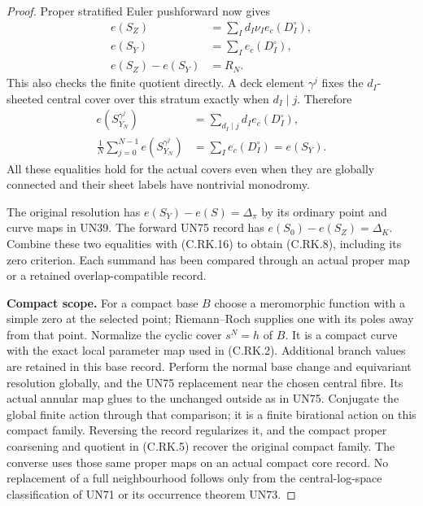 \begin{proof}
Proper stratified Euler
pushforward now gives
\[
 \begin{split}
 e(S_Z)&=\sum_I d_I\nu_I e_c(D_I^\circ),\\
 e(S_Y)&=\sum_I e_c(D_I^\circ),\\
 e(S_Z)-e(S_Y)&=R_N.
 \end{split}
\tag{C.RK.16}
\]
This also checks the finite
quotient directly. A deck
element $\gamma^j$ fixes the
$d_I$-sheeted central cover
over this stratum exactly
when $d_I\mid j$. Therefore
\[
 \begin{split}
 e(S_{Y_N}^{\gamma^j})
       &=\sum_{d_I\mid j}d_I e_c(D_I^\circ),\\
 \frac1N\sum_{j=0}^{N-1}
          e(S_{Y_N}^{\gamma^j})
       &=\sum_I e_c(D_I^\circ)=e(S_Y).
 \end{split}
\tag{C.RK.17}
\]
All these equalities hold for
the actual covers even when
they are globally connected
and their sheet labels have
nontrivial monodromy.

The original resolution has
$e(S_Y)-e(S)=\Delta_\pi$ by
its ordinary point and curve
maps in UN39. The forward
UN75 record has
$e(S_0)-e(S_Z)=\Delta_K$.
Combine these two equalities
with (C.RK.16) to obtain
(C.RK.8), including its zero
criterion. Each summand has
been compared through an
actual proper map or a
retained overlap-compatible
record.

\par\medskip\noindent\textbf{Compact scope.}
For a compact base $B$ choose
a meromorphic function with
a simple zero at the selected
point; Riemann--Roch supplies
one with its poles away from
that point. Normalize the
cyclic cover $s^N=h$ of $B$.
It is a compact curve with
the exact local parameter
map used in (C.RK.2).
Additional branch values
are retained in this base
record. Perform the normal
base change and equivariant
resolution globally, and
the UN75 replacement near
the chosen central fibre.
Its actual annular map
glues to the unchanged
outside as in UN75. Conjugate
the global finite action
through that comparison;
it is a finite birational
action on this compact
family. Reversing the
record regularizes it,
and the compact proper
coarsening and quotient
in (C.RK.5) recover the
original compact family.
The converse uses those
same proper maps on an
actual compact core record.
No replacement of a full
neighbourhood follows only
from the central-log-space
classification of UN71
or its occurrence theorem
UN73.
\end{proof}
